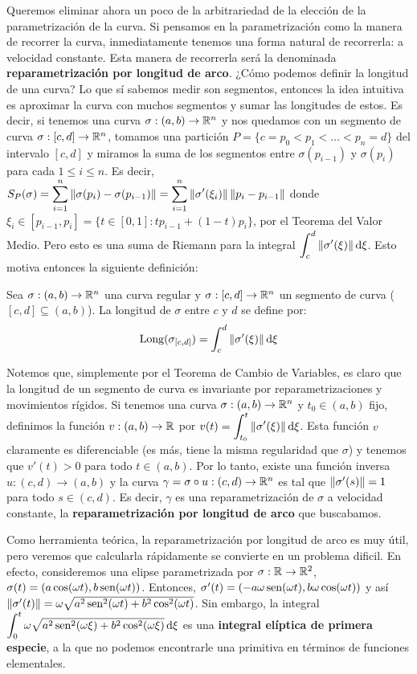 Queremos eliminar ahora un poco de la arbitrariedad de la elección de la parametrización de la curva. Si pensamos en la parametrización como la manera de recorrer la curva, inmediatamente tenemos una forma natural de recorrerla: a velocidad constante. Esta manera de recorrerla será la denominada \textbf{reparametrización por longitud de arco}. ¿Cómo podemos definir la longitud de una curva? Lo que sí sabemos medir son segmentos, entonces la idea intuitiva es aproximar la curva con muchos segmentos y sumar las longitudes de estos. Es decir, si tenemos una curva $\sigma:(a,b)\to\mathbb{R}^n$ y nos quedamos con un segmento de curva $\sigma:[c,d]\to\mathbb{R}^n$, tomamos una partición $P=\{c=p_0<p_1<\ldots <p_n=d\}$ del intervalo $[c,d]$ y miramos la suma de los segmentos entre $\sigma(p_{i-1})$ y $\sigma(p_i)$ para cada $1\leq i\leq n$. Es decir, $S_P(\sigma)=\displaystyle\sum_{i=1}^n \left\| \sigma(p_i)-\sigma(p_{i-1}) \right\|=\displaystyle\sum_{i=1}^n \left\| \sigma'(\xi_i) \right\|\left\| p_i-p_{i-1} \right\|$ donde $\xi_i\in [p_{i-1},p_i] =\{t\in [0,1] : tp_{i-1}+(1-t)p_i\}$, por el Teorema del Valor Medio. Pero esto es una suma de Riemann para la integral $\displaystyle\int_c^d \left\| \sigma'(\xi) \right\|\mathop{}\!\mathrm{d}\xi$. Esto motiva entonces la siguiente definición:

\begin{defn}
Sea $\sigma:(a,b)\to\mathbb{R}^n$ una curva regular y $\sigma:[c,d]\to\mathbb{R}^n$ un segmento de curva ($[c,d]\subseteq (a,b)$). La longitud de $\sigma$ entre $c$ y $d$ se define por: $$\mathrm{Long}(\sigma_{[c,d]}) = \int_c^d \left\| \sigma'(\xi) \right\|\mathop{}\!\mathrm{d}\xi$$
\end{defn}

Notemos que, simplemente por el Teorema de Cambio de Variables, es claro que la longitud de un segmento de curva es invariante por reparametrizaciones y movimientos rígidos. Si tenemos una curva $\sigma:(a,b)\to\mathbb{R}^n$ y $t_0\in (a,b)$ fijo, definimos la función $v:(a,b)\to\mathbb{R}$ por $v(t)=\displaystyle\int_{t_0}^t \left\| \sigma'(\xi) \right\|\mathop{}\!\mathrm{d}\xi$. Esta función $v$ claramente es diferenciable (es más, tiene la misma regularidad que $\sigma$) y tenemos que $v'(t)>0$ para todo $t\in (a,b)$. Por lo tanto, existe una función inversa $u:(c,d)\to (a,b)$ y la curva $\gamma=\sigma\circ u:(c,d)\to\mathbb{R}^n$ es tal que $\left\| \sigma'(s) \right\|=1$ para todo $s\in (c,d)$. Es decir, $\gamma$ es una reparametrización de $\sigma$ a velocidad constante, la \textbf{reparametrización por longitud de arco} que buscabamos.

Como herramienta teórica, la reparametrización por longitud de arco es muy útil, pero veremos que calcularla rápidamente se convierte en un problema dificil. En efecto, consideremos una elipse parametrizada por $\sigma:\mathbb{R}\to\mathbb{R}^2$, $\sigma(t)=(a\cos(\omega t),b\operatorname{sen}(\omega t))$. Entonces, $\sigma'(t)=(-a\omega\operatorname{sen}(\omega t),b\omega\cos(\omega t))$ y así $\left\| \sigma'(t) \right\|=\omega \sqrt{a^2\operatorname{sen}^2(\omega t) + b^2\cos^2(\omega t)}$. Sin embargo, la integral $\displaystyle\int_0^t \omega\sqrt{a^2\operatorname{sen}^2(\omega \xi)+b^2\cos^2(\omega \xi)}\mathop{}\!\mathrm{d} \xi$ es una \textbf{integral elíptica de primera especie}, a la que no podemos encontrarle una primitiva en términos de funciones elementales.

